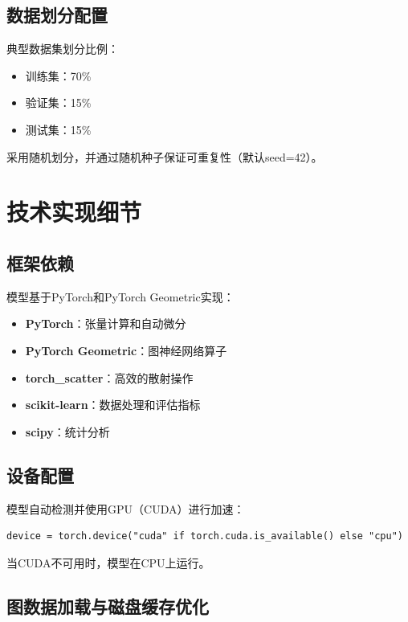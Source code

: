 \documentclass[UTF8, a4paper, 12pt]{article}
\begin{document}
\subsection{数据划分配置}

典型数据集划分比例：
\begin{itemize}
    \item 训练集：70\%
    \item 验证集：15\%
    \item 测试集：15\%
\end{itemize}

采用随机划分，并通过随机种子保证可重复性（默认seed=42）。

\newpage

\section{技术实现细节}

\subsection{框架依赖}

模型基于PyTorch和PyTorch Geometric实现：

\begin{itemize}
    \item \textbf{PyTorch}：张量计算和自动微分
    \item \textbf{PyTorch Geometric}：图神经网络算子
    \item \textbf{torch\_scatter}：高效的散射操作
    \item \textbf{scikit-learn}：数据处理和评估指标
    \item \textbf{scipy}：统计分析
\end{itemize}

\subsection{设备配置}

模型自动检测并使用GPU（CUDA）进行加速：
\begin{verbatim}
device = torch.device("cuda" if torch.cuda.is_available() else "cpu")
\end{verbatim}

当CUDA不可用时，模型在CPU上运行。

\subsection{图数据加载与磁盘缓存优化}
\end{document}
